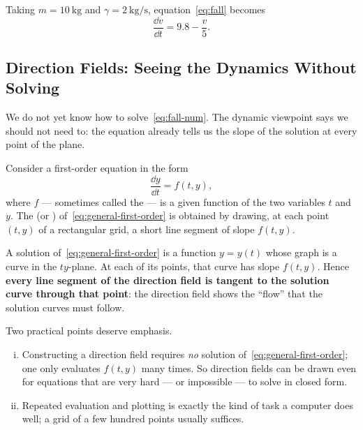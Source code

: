 Taking \(m = \SI{10}{\kilogram}\) and \(\gamma = \SI{2}{\kilogram\per\second}\),
equation~\eqref{eq:fall} becomes
\begin{equation}\label{eq:fall-num}
	\frac{\dd v}{\dd t} = 9.8 - \frac{v}{5}.
\end{equation}

\subsection{Direction Fields: Seeing the Dynamics Without Solving}


We do not yet know how to solve~\eqref{eq:fall-num}. The dynamic viewpoint says we
should not need to: the equation already tells us the slope of the solution at every
point of the plane.

\begin{definition}
	Consider a first-order equation in the form
	\begin{equation}\label{eq:general-first-order}
		\frac{\dd y}{\dd t} = f(t, y),
	\end{equation}
	where \(f\) --- sometimes called the  --- is a given function of
	the two variables \(t\) and \(y\). The  (or ) of~\eqref{eq:general-first-order} is obtained by drawing, at each point
	\((t, y)\) of a rectangular grid, a short line segment of slope \(f(t, y)\).
\end{definition}

\begin{intuition}
	A solution of~\eqref{eq:general-first-order} is a function \(y = y(t)\) whose graph
	is a curve in the \(ty\)-plane. At each of its points, that curve has slope
	\(f(t,y)\). Hence \textbf{every line segment of the direction field is tangent to
		the solution curve through that point}: the direction field shows the ``flow'' that
	the solution curves must follow.
\end{intuition}

\begin{remark}
	Two practical points deserve emphasis.
	\begin{enumerate}[(i)]
		\item Constructing a direction field requires \emph{no} solution
		      of~\eqref{eq:general-first-order}; one only evaluates \(f(t,y)\) many times.
		      So direction fields can be drawn even for equations that are very hard --- or
		      impossible --- to solve in closed form.
		\item Repeated evaluation and plotting is exactly the kind of task a computer does
		      well; a grid of a few hundred points usually suffices.
	\end{enumerate}
\end{remark}

